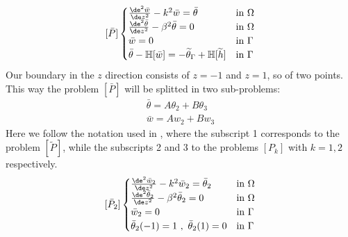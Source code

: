 \[
[\bar P]
\begin{cases}
\frac{\de^2 \bar w}{\de z^2}-k^2\bar w=\bar\theta &\textnormal{in }\Omega\\
\frac{\de^2\bar\theta}{\de z^2}-\beta^2 \bar\theta=0 &\textnormal{in }\Omega\\
\bar w=0 &\textnormal{in }\Gamma\\
\bar\theta-\mathbb{H}[\bar w]=-\widetilde{\theta}_\Gamma+\mathbb{H}[\widetilde{h}] & \textnormal{in }\Gamma\\
\end{cases}
\]
Our boundary in the $z$ direction consists of $z=-1$ and $z=1$, so of two points. This way the problem $[\bar P]$ will be splitted in two sub-problems:
\[
\begin{array}{l}
\bar \theta=A\theta_2+B\theta_3\\
\bar w=Aw_2+Bw_3
\end{array}
\]
Here we follow the notation used in \cite{Guasti_2012}, where the subscript 1 corresponds to the problem $[\widetilde{P}]$, while the subscripts 2 and 3 to the problems $[P_k]$ with $k=1,2$ respectively.
\[
[\bar P_2]
\begin{cases}
\frac{\de^2 \bar w_2}{\de z^2}-k^2\bar w_2=\bar\theta_2 &\textnormal{in }\Omega\\
\frac{\de^2\bar\theta_2}{\de z^2}-\beta^2 \bar\theta_2=0 &\textnormal{in }\Omega\\
\bar w_2=0 &\textnormal{in }\Gamma\\
\bar\theta_2(-1)=1 \ ,\  \bar\theta_2(1)=0 & \textnormal{in }\Gamma\\
\end{cases}
\]

